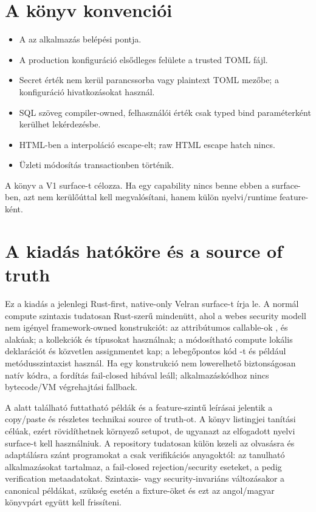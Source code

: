 \section*{A könyv konvenciói}

\begin{itemize}
  \item A  az alkalmazás belépési pontja.
  \item A production konfiguráció elsődleges felülete a trusted TOML fájl.
  \item Secret érték nem kerül parancssorba vagy plaintext TOML mezőbe; a konfiguráció  hivatkozásokat használ.
  \item SQL szöveg compiler-owned, felhasználói érték csak typed bind paraméterként kerülhet lekérdezésbe.
  \item HTML-ben a  interpoláció escape-elt; raw HTML escape hatch nincs.
  \item Üzleti módosítás transactionben történik.
\end{itemize}

A könyv a V1 surface-t célozza. Ha egy capability nincs benne ebben a surface-ben, azt nem kerülőúttal kell megvalósítani, hanem külön nyelvi/runtime feature-ként.

\section*{A kiadás hatóköre és a source of truth}

Ez a kiadás a jelenlegi Rust-first, native-only Velran surface-t írja le. A normál compute szintaxis tudatosan Rust-szerű mindenütt, ahol a webes security modell nem igényel framework-owned konstrukciót: az attribútumos callable-ok ,  és  alakúak; a kollekciók  és  típusokat használnak; a módosítható compute lokális  deklarációt és közvetlen assignmentet kap; a lebegőpontos kód -t és például  metódusszintaxist használ. Ha egy konstrukció nem lowerelhető biztonságosan natív kódra, a fordítás fail-closed hibával leáll; alkalmazáskódhoz nincs bytecode/VM végrehajtási fallback.

A  alatt található futtatható példák és a  feature-szintű leírásai jelentik a copy/paste és részletes technikai source of truth-ot. A könyv listingjei tanítási célúak, ezért rövidíthetnek környező setupot, de ugyanazt az elfogadott nyelvi surface-t kell használniuk. A repository tudatosan külön kezeli az olvasásra és adaptálásra szánt programokat a csak verifikációs anyagoktól: az  tanulható alkalmazásokat tartalmaz, a  fail-closed rejection/security eseteket, a  pedig verification metaadatokat. Szintaxis- vagy security-invariáns változásakor a canonical példákat, szükség esetén a fixture-öket és ezt az angol/magyar könyvpárt együtt kell frissíteni.



